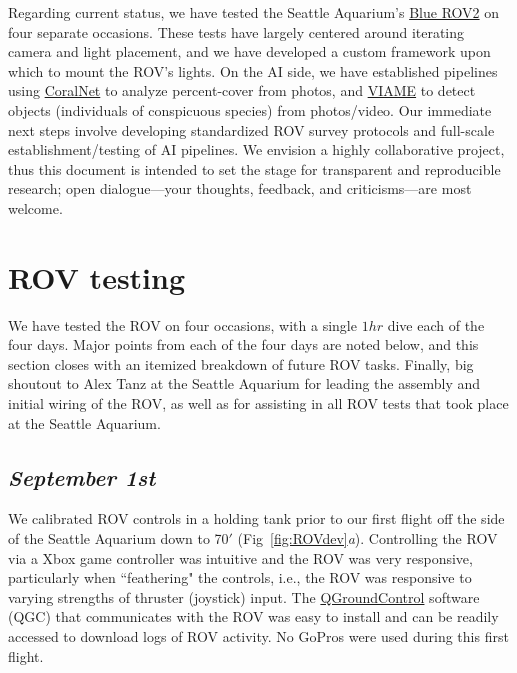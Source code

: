 \documentclass[11pt]{article}
\begin{document}
Regarding current status, we have tested the Seattle Aquarium's 
\href{https://bluerobotics.com/wp-content/uploads/2020/02/br_bluerov2_datasheet_rev6.pdf}{Blue
 ROV2} on four separate occasions.
These tests have largely centered around iterating camera and light 
placement, and we have developed a custom framework upon which to mount 
the ROV's lights. 
On the AI side, we have established pipelines using 
\href{https://coralnet.ucsd.edu/blog/a-new-deep-learning-engine-for-coralnet/}{CoralNet}
 to analyze percent-cover from photos, and 
\href{https://www.viametoolkit.org/}{VIAME} to detect objects 
(individuals of conspicuous species) from photos/video. 
Our immediate next steps involve developing standardized ROV survey 
protocols and full-scale establishment/testing of AI pipelines. 
We envision a highly collaborative project, thus this document is 
intended to set the stage for transparent and reproducible research;
open dialogue---your thoughts, feedback, and criticisms---are most 
welcome.  





\section{ROV testing}
We have tested the ROV on four occasions, with a single $1hr$ dive each 
of the four days. 
Major points from each of the four days are noted below, and this 
section closes with an itemized breakdown of future ROV tasks. 
Finally, big shoutout to Alex Tanz at the Seattle Aquarium for leading 
the assembly and initial wiring of the ROV, as well as for assisting in 
all ROV tests that took place at the Seattle Aquarium. 

\subsection{\textit{September 1st}}
We calibrated ROV controls in a holding tank prior to our first flight 
off the side of the Seattle Aquarium down to 70$'$ 
(Fig~\ref{fig:ROVdev}\textit{a}). 
Controlling the ROV via a Xbox game controller was intuitive and the 
ROV was very responsive, particularly when ``feathering" the controls, 
i.e., the ROV was responsive to varying strengths of thruster 
(joystick) input. 
The 
\href{https://bluerobotics.com/learn/bluerov2-software-setup/}{QGroundControl}
 software (QGC) that communicates with the ROV was easy to install and 
 can be readily accessed to download logs of ROV activity.
No GoPros were used during this first flight.
	
\end{document}
